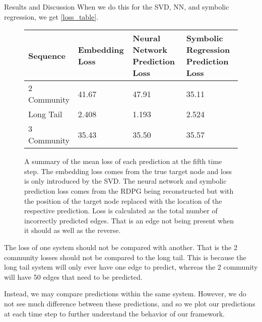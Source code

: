 \documentclass[12pt]{amsart}
\begin{document}
\begin{section}{Results and Discussion}
    When we do this for the SVD, NN, and symbolic regression, we get \autoref{loss_table}.
    \begin{figure}
        \begin{center}
            \begin{tabular}{| m{} | m{} | m{} | m{} |}
                \hline
                Sequence & Embedding Loss & Neural Network Prediction Loss & Symbolic Regression Prediction Loss\\ 
                \hline
                \hline
                2 Community & 41.67 & 47.91 & 35.11\\ 
                \hline 
                Long Tail & 2.408 & 1.193 & 2.524 \\ 
                \hline 
                3 Community & 35.43 & 35.50 & 35.57 \\ 
                \hline 
            \end{tabular}
            \end{center}
            \caption{A summary of the mean loss of each prediction at the fifth time step. The embedding loss comes from the true target node and loss is only introduced by the SVD. The neural network and symbolic prediction loss comes from the RDPG being reconstructed but with the position of the target node replaced with the location of the respective prediction. Loss is calculated as the total number of incorrectly predicted edges. That is an edge not being present when it should as well as the reverse.}
            \label{loss_table}
    \end{figure}

    The loss of one system should not be compared with another. That is the 2 community losses should not be compared to the long tail. This is because the long tail system will only ever have one edge to predict, whereas the 2 community will have 50 edges that need to be predicted.

    Instead, we may compare predictions within the same system. However, we do not see much difference between these predictions, and so we plot our predictions at each time step to further understand the behavior of our framework.


\end{section}
\end{document}
